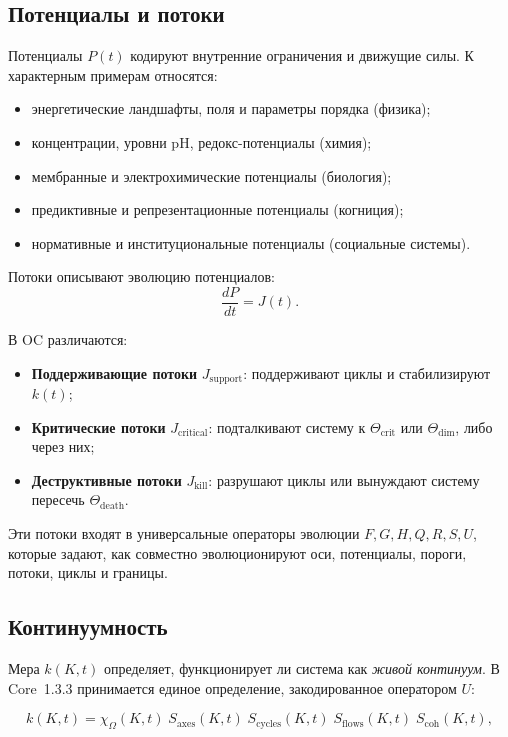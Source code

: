 \subsection{Потенциалы и потоки}

Потенциалы \(P(t)\) кодируют внутренние ограничения и движущие силы.
К характерным примерам относятся:

\begin{itemize}
    \item энергетические ландшафты, поля и параметры порядка (физика);
    \item концентрации, уровни pH, редокс-потенциалы (химия);
    \item мембранные и электрохимические потенциалы (биология);
    \item предиктивные и репрезентационные потенциалы (когниция);
    \item нормативные и институциональные потенциалы (социальные системы).
\end{itemize}

Потоки описывают эволюцию потенциалов:
\[
\frac{dP}{dt} = J(t).
\]

В OC различаются:

\begin{itemize}
    \item \textbf{Поддерживающие потоки} \(J_{\mathrm{support}}\): поддерживают циклы и стабилизируют \(k(t)\);
    \item \textbf{Критические потоки} \(J_{\mathrm{critical}}\): подталкивают систему к \(\Theta_{\mathrm{crit}}\) или \(\Theta_{\mathrm{dim}}\), либо через них;
    \item \textbf{Деструктивные потоки} \(J_{\mathrm{kill}}\): разрушают циклы или вынуждают систему пересечь \(\Theta_{\mathrm{death}}\).
\end{itemize}

Эти потоки входят в универсальные операторы эволюции \(F, G, H, Q, R, S, U\), которые задают, как совместно эволюционируют оси, потенциалы, пороги, потоки, циклы и границы.

\subsection{Континуумность}

Мера \(k(K,t)\) определяет, функционирует ли система как \emph{живой континуум}.
В Core~1.3.3 принимается единое определение, закодированное оператором \(U\):

\[
k(K,t) =
\chi_{\Omega}(K,t)\;
S_{\mathrm{axes}}(K,t)\;
S_{\mathrm{cycles}}(K,t)\;
S_{\mathrm{flows}}(K,t)\;
S_{\mathrm{coh}}(K,t),
\]

